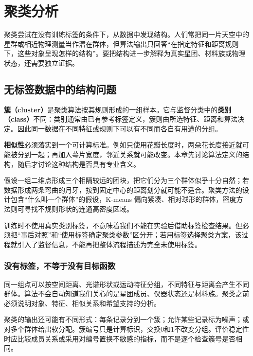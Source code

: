 \chapter{聚类分析}

聚类尝试在没有训练标签的条件下，从数据中发现结构。人们常把同一片天空中的星群或相近物理测量当作潜在群体，但算法输出只回答“在指定特征和距离规则下，这些对象呈现怎样的结构”。要把结构进一步解释为真实星团、材料族或物理状态，还需要独立证据。
\section{无标签数据中的结构问题}

\textbf{簇（cluster）}是聚类算法按其规则形成的一组样本。它与监督分类中的\textbf{类别（class）}不同：类别通常由已有参考标签定义，簇则由所选特征、距离和算法决定。因此同一数据在不同特征或规则下可以有不同而各自有用途的分组。

\textbf{相似性}必须落实到一个可计算标准。例如只使用花瓣长度时，两朵花长度接近就可能被分到一起；再加入萼片宽度，邻近关系就可能改变。本章先讨论算法定义的结构，随后才讨论这种结构是否具有专业含义。

假设一组二维点形成三个相隔较远的团块，把它们分为三个群体似乎十分自然；若数据形成两条弯曲的月牙，按到固定中心的距离划分就可能不适合。聚类方法的设计包含“什么叫一个群体”的假设，K-means 偏向紧凑、相对球形的群体，密度方法则可寻找不规则形状的连通高密度区域。

训练时不使用真实类别标签，不意味着我们不能在实验后借助标签检查结果。但必须把“事后对照”和“使用标签确定聚类参数”区分开；若用标签选择聚类方案，该过程就引入了监督信息，不能再把整体流程描述为完全未使用标签。

\subsection{没有标签，不等于没有目标函数}
同一组点可以按空间距离、光谱形状或运动特征分组，不同特征与距离会产生不同群体。算法不会自动知道我们关心的是星团成员、仪器状态还是材料族。聚类之前必须说明对象、特征、相似关系和希望支持的分析。

聚类的输出还可能有不同形式：每条记录分到一个簇；允许某些记录标为噪声；或对多个群体给出软分配。簇编号只是计算标识，交换0和1不改变分组。评价稳定性时应比较成员关系或采用对编号置换不敏感的指标，而不是逐个检查簇号是否相同。

